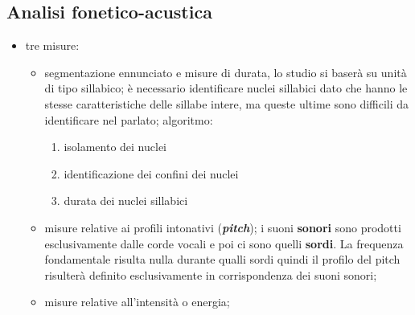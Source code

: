 \documentclass[twoside,twocolumn,11pt]{extarticle}
\theoremstyle{definition}
\begin{document}
	\subsection{Analisi fonetico-acustica}
		\begin{itemize}
			\item tre misure:
			\begin{itemize}
				\item segmentazione ennunciato e misure di durata, lo studio si baserà su unità di tipo sillabico; è necessario identificare nuclei sillabici dato che hanno le stesse caratteristiche delle sillabe intere, ma queste ultime sono difficili da identificare nel parlato; algoritmo:
					\begin{enumerate}
						\item isolamento dei nuclei
						\item identificazione dei confini dei nuclei
						\item durata dei nuclei sillabici
					\end{enumerate}
				\item misure relative ai profili intonativi (\textbf{\textit{pitch}}); i suoni \textbf{sonori} sono prodotti esclusivamente dalle corde vocali e poi ci sono quelli \textbf{sordi}. La frequenza fondamentale risulta nulla durante qualli sordi quindi il profilo del pitch risulterà definito esclusivamente in corrispondenza dei suoni sonori;
				\item misure relative all'intensità o energia;
			\end{itemize}
		\end{itemize}
	
\end{document}
